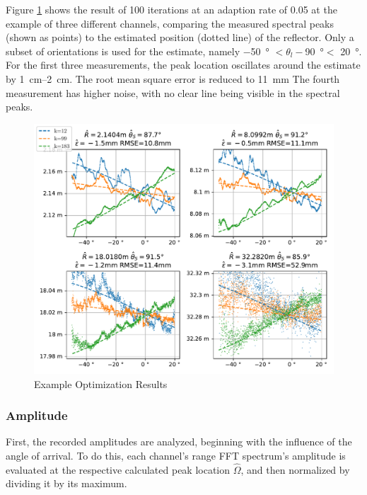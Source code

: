 Figure \ref{fig:reflpos_estimate} shows the result of 100 iterations at an adaption rate of 0.05 at the example of three different channels,
comparing the measured spectral peaks (shown as points) to the estimated position (dotted line) of the reflector.
Only a subset of orientations is used for the estimate,
namely \SI{-50}{\degree} $<\theta_l-$\SI{90}{\degree}$<$ \SI{20}{\degree}. \\


For the first three measurements, the peak location oscillates around the estimate by \SIrange[range-units=single]{1}{2}{\cm}.
The root mean square error is reduced to \SI{11}{\mm}
The fourth measurement has higher noise, with no clear line being visible in the spectral peaks.

\begin{figure}
    \centering
    \includegraphics[width=\textwidth]{../figures/reflpos_estimate.pdf}
    \caption{Example Optimization Results}
    \label{fig:reflpos_estimate}
\end{figure}

\subsubsection*{Amplitude}
First, the recorded amplitudes are analyzed, beginning with the influence of the angle of arrival.
To do this, each channel's range FFT spectrum's amplitude is evaluated at the respective calculated peak location $\hat \Omega$,
and then normalized by dividing it by its maximum.

